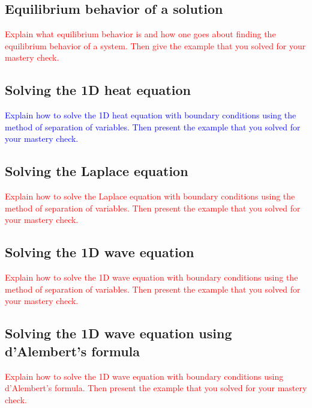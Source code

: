 \documentclass{article}
\newcommand{\red}[1]{\textcolor{red}{#1}}
\newcommand{\blue}[1]{\textcolor{blue}{#1}}
\begin{document}
\subsection{Equilibrium behavior of a solution}
\red{Explain what equilibrium behavior is and how one goes about finding the equilibrium behavior of a system. Then give the example that you solved for your mastery check.}
\subsection{Solving the 1D heat equation}
\blue{Explain how to solve the 1D heat equation with boundary conditions using the method of separation of variables. Then present the example that you solved for your mastery check.}
\subsection{Solving the Laplace equation}
\red{Explain how to solve the Laplace equation with boundary conditions using the method of separation of variables. Then present the example that you solved for your mastery check.}
\subsection{Solving the 1D wave equation}
\red{Explain how to solve the 1D wave equation with boundary conditions using the method of separation of variables. Then present the example that you solved for your mastery check.}
\subsection{Solving the 1D wave equation using d'Alembert's formula}
\red{Explain how to solve the 1D wave equation with boundary conditions using d'Alembert's formula. Then present the example that you solved for your mastery check.}
\begin{bibdiv}
\begin{biblist}
\end{biblist}
\end{bibdiv}
\end{document}
